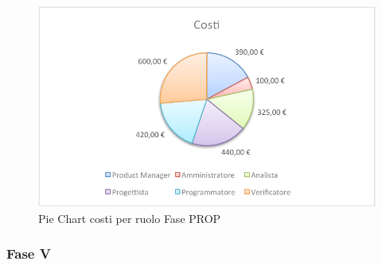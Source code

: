 				\begin{figure}[H]\centering
					\includegraphics[width=\textwidth]{PianoDiProgetto/Pics/ChartTotCostiFasePROP.pdf}
					\caption{Pie Chart costi per ruolo Fase PROP}
				\end{figure}
		\subsubsection{Fase V}
